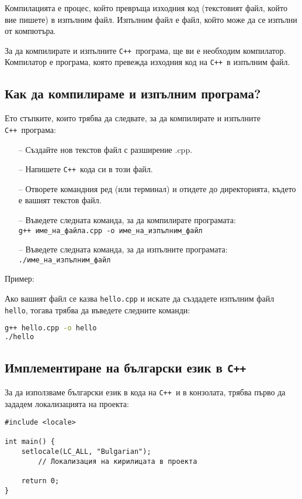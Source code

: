 \documentclass[oneside]{book}
\newcommand*{\code}[1]{\texttt{#1}}
\newcommand*{\cpp}{\texttt{C++}\ }
\begin{document}
Компилацията е процес, който превръща изходния код (текстовият файл, който вие пишете) в изпълним файл.
Изпълним файл е файл, който може да се изпълни от компютъра.

За да компилирате и изпълните \cpp програма, ще ви е необходим компилатор.
Компилатор е програма, която превежда изходния код на \cpp в изпълним файл.

\subsection{Как да компилираме и изпълним програма?}
Ето стъпките, които трябва да следвате, за да компилирате и изпълните \cpp програма:

\begin{enumerate}
    \item[--] Създайте нов текстов файл с разширение .cpp.
    \item[--] Напишете \cpp кода си в този файл.
    \item[--] Отворете командния ред (или терминал) и отидете до директорията, където е вашият текстов файл.
    \item[--] Въведете следната команда, за да компилирате програмата:\\
        \code{g++ име\_на\_файла.cpp -o име\_на\_изпълним\_файл}
    \item[--] Въведете следната команда, за да изпълните програмата:\\
        \code{./име\_на\_изпълним\_файл}
\end{enumerate}

Пример:

Ако вашият файл се казва \code{hello.cpp} и искате да създадете изпълним файл \code{hello}, тогава трябва да въведете следните команди:

\begin{mdframed}\begin{lstlisting}[language=bash]
g++ hello.cpp -o hello
./hello
\end{lstlisting}\end{mdframed}

\subsection{Имплементиране на български език в \cpp}
За да използваме български език в кода на \cpp и в конзолата, трябва първо да
зададем локализацията на проекта:
\begin{mdframed}\begin{lstlisting}
#include <locale>

int main() {
    setlocale(LC_ALL, "Bulgarian");
        // Локализация на кирилицата в проекта

    return 0;
}
\end{lstlisting}\end{mdframed}
\end{document}
